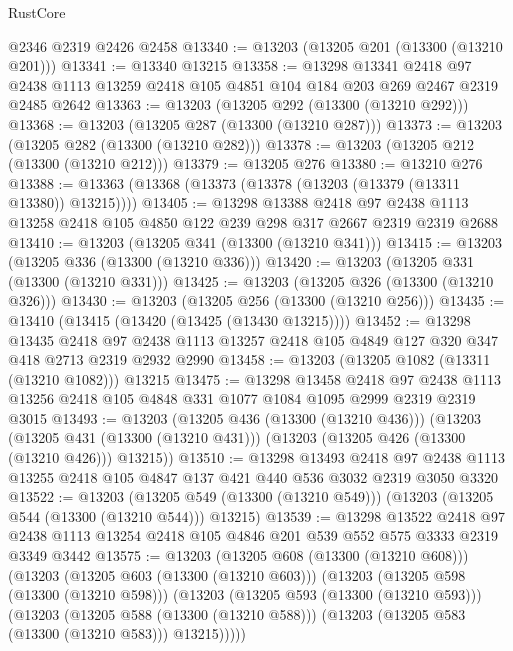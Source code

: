 \begin{lexlean}{RustCore}
\begin{coremodule}
    @2346
    @2319
    @2426
    @2458
@13340 := @13203 (@13205 @201 (@13300 (@13210 @201)))
@13341 := @13340 @13215
@13358 := @13298
    @13341
    @2418
    @97
    @2438
    @1113
    @13259
    @2418
    @105
    @4851
    @104
    @184
    @203
    @269
    @2467
    @2319
    @2485
    @2642
@13363 := @13203 (@13205 @292 (@13300 (@13210 @292)))
@13368 := @13203 (@13205 @287 (@13300 (@13210 @287)))
@13373 := @13203 (@13205 @282 (@13300 (@13210 @282)))
@13378 := @13203 (@13205 @212 (@13300 (@13210 @212)))
@13379 := @13205 @276
@13380 := @13210 @276
@13388 := @13363 (@13368 (@13373 (@13378 (@13203 (@13379 (@13311 @13380)) @13215))))
@13405 := @13298
    @13388
    @2418
    @97
    @2438
    @1113
    @13258
    @2418
    @105
    @4850
    @122
    @239
    @298
    @317
    @2667
    @2319
    @2319
    @2688
@13410 := @13203 (@13205 @341 (@13300 (@13210 @341)))
@13415 := @13203 (@13205 @336 (@13300 (@13210 @336)))
@13420 := @13203 (@13205 @331 (@13300 (@13210 @331)))
@13425 := @13203 (@13205 @326 (@13300 (@13210 @326)))
@13430 := @13203 (@13205 @256 (@13300 (@13210 @256)))
@13435 := @13410 (@13415 (@13420 (@13425 (@13430 @13215))))
@13452 := @13298
    @13435
    @2418
    @97
    @2438
    @1113
    @13257
    @2418
    @105
    @4849
    @127
    @320
    @347
    @418
    @2713
    @2319
    @2932
    @2990
@13458 := @13203 (@13205 @1082 (@13311 (@13210 @1082))) @13215
@13475 := @13298
    @13458
    @2418
    @97
    @2438
    @1113
    @13256
    @2418
    @105
    @4848
    @331
    @1077
    @1084
    @1095
    @2999
    @2319
    @2319
    @3015
@13493 := @13203
    (@13205 @436 (@13300 (@13210 @436)))
    (@13203
      (@13205 @431 (@13300 (@13210 @431)))
      (@13203 (@13205 @426 (@13300 (@13210 @426))) @13215))
@13510 := @13298
    @13493
    @2418
    @97
    @2438
    @1113
    @13255
    @2418
    @105
    @4847
    @137
    @421
    @440
    @536
    @3032
    @2319
    @3050
    @3320
@13522 := @13203
    (@13205 @549 (@13300 (@13210 @549)))
    (@13203 (@13205 @544 (@13300 (@13210 @544))) @13215)
@13539 := @13298
    @13522
    @2418
    @97
    @2438
    @1113
    @13254
    @2418
    @105
    @4846
    @201
    @539
    @552
    @575
    @3333
    @2319
    @3349
    @3442
@13575 := @13203
    (@13205 @608 (@13300 (@13210 @608)))
    (@13203
      (@13205 @603 (@13300 (@13210 @603)))
      (@13203
        (@13205 @598 (@13300 (@13210 @598)))
        (@13203
          (@13205 @593 (@13300 (@13210 @593)))
          (@13203
            (@13205 @588 (@13300 (@13210 @588)))
            (@13203 (@13205 @583 (@13300 (@13210 @583))) @13215)))))

\end{coremodule}
\end{lexlean}
